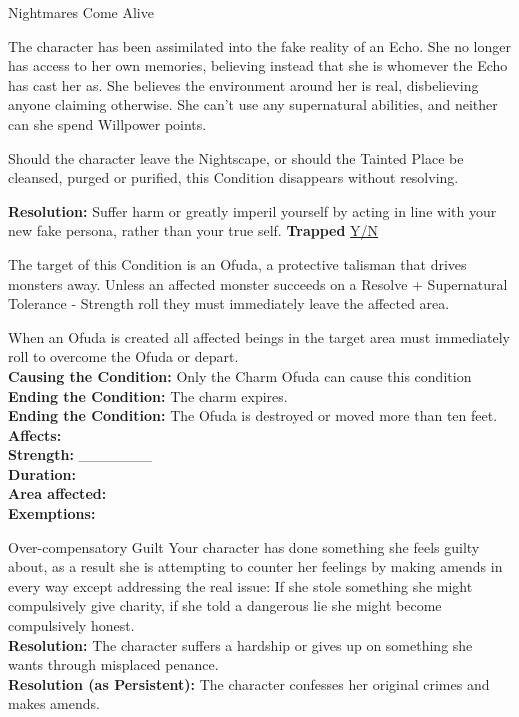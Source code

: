 \documentclass[10pt, frontgrid, backgrid]{flacards}
\begin{document}
\Cond
{Nightmares Come Alive}
{
The character has been assimilated into the fake reality of an Echo. She no longer has access to her own memories, believing instead that she is whomever the Echo has cast her as. She believes the environment around her is real, disbelieving anyone claiming otherwise. She can’t use any supernatural abilities, and neither can she spend Willpower points.

Should the character leave the Nightscape, or should the Tainted Place be cleansed, purged or purified, this Condition disappears without resolving. 

\textbf{Resolution:} Suffer harm or greatly imperil yourself by acting in line with your new fake persona, rather than your true self.
\textbf{Trapped} \underline{Y/N}
}


{The target of this Condition is an Ofuda, a protective talisman that drives monsters away. Unless an affected monster succeeds on a Resolve + Supernatural Tolerance - Strength roll they must immediately leave the affected area.

When an Ofuda is created all affected beings in the target area must immediately roll to overcome the Ofuda or depart.\\
\textbf{Causing the Condition:} Only the Charm Ofuda can cause this condition\\
\textbf{Ending the Condition:} The charm expires. \\
\textbf{Ending the Condition:} The Ofuda is destroyed or moved more than ten feet. \\
\textbf{Affects:} \fillunderline \\
\textbf{Strength:} \_\_\_\_\_\_\_ \\
\textbf{Duration:} \fillunderline \\
\textbf{Area affected:} \fillunderline\\
\textbf{Exemptions:} \fillunderline}

\Cond
{Over-compensatory Guilt}
{Your character has done something she feels guilty about, as a result she is attempting to counter her feelings by making amends in every way except addressing the real issue: If she stole something she might compulsively give charity, if she told a dangerous lie she might become compulsively honest. \\
\textbf{Resolution:} The character suffers a hardship or gives up on something she wants through misplaced penance.\\
\textbf{Resolution (as Persistent):} The character confesses her original crimes and makes amends.
}
\end{document}

